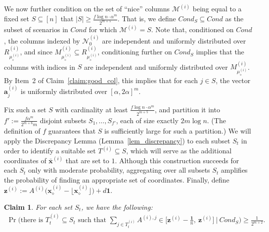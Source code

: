 \documentclass{article}
\newcommand{\cN}{\mathcal{N}}
\newcommand{\dv}[0]{\mathbf{d}}
\newcommand{\av}[0]{\mathbf{a}}
\newcommand{\xv}[0]{\mathbf{x}}
\newcommand{\zv}[0]{\mathbf{z}}
\newcommand{\ones}{{\bm{1}}}
\newcommand{\cM}{\mathcal{M}}
\newcommand{\colij}{\av^{(i)}_j}
\newtheorem{claim}[thm]{Claim}
\newcommand{\nrc}{R}
\begin{document}
We now further condition on the set of ``nice'' columns
$\cM^{(i)}$ being equal to a fixed set $S \subseteq [n]$ that $|S| \geq \frac{f \log n \cdot \alpha^m}{2^{m+{5}}} $.
That is, we define $Cond_S \subseteq Cond$ as the subset of scenarios in $Cond$
for which $\cM^{(i)} = S$.
Note that, conditioned on $Cond$, the columns indexed by $\cN^{(i)}_0$ are
independent and uniformly distributed over
$\nrc^{(i)}_{\mu^{(i)}_\diamond}$, and since
$M^{(i)}_{\mu^{(i)}_{\diamond}} \subseteq \nrc^{(i)}_{\mu^{(i)}_\diamond}$,
conditioning further on $Cond_S$ implies that the columns with indices in $S$
are independent and uniformly distributed over
$M^{(i)}_{\mu^{(i)}_{\diamond}}$.
By Item~2 of Claim~\ref{claim:good_col}, this implies that for each $j \in S$,
the vector $\colij$ is uniformly distributed over $[\alpha, 2\alpha]^m$.

Fix such a set $S$ with cardinality at least
$\frac{f \log n \cdot \alpha^m}{2^{m+5}}$, and partition it into
$f' := \frac{f \alpha^m}{2^{m+6} m}$
disjoint subsets $S_1,\ldots,S_{f'}$, each of size exactly $2m \log n$.
(The definition of $f$ guarantees that $S$ is sufficiently large for such a
partition.) 
We will apply the Discrepancy Lemma (Lemma~\ref{lem_discrepancy}) to each subset
$S_t$ in order to identify a suitable set
$T^{(i)} \subseteq S$, which will serve as the additional coordinates of
$\bar{\xv}^{(i)}$ that are set to $1$.
Although this construction succeeds for each $S_t$ only with moderate
probability, aggregating over all subsets $S_t$ amplifies the probability of
finding an appropriate set of coordinates.
Finally, define
$
\zv^{(i)} :=
A^{(i)} \big(\xv^{(i)}_{\diamond}
- \lfloor \xv^{(i)}_{\diamond} \rfloor \big) + d \ones.$


\begin{claim} \label{claim:useDiscrepancy}
    For each set $S_t$, we have the following:
    \begin{align*}
        \Pr\bigg( \textrm{there is } T^{(i)}_t \subseteq S_t \textrm{ such that } \sum_{j \in T^{(i)}_t} A^{(i),j} \in \bigg[\zv^{(i)} - \frac{\ones}{n},~\zv^{(i)} \bigg] ~\bigg|~ Cond_S\bigg) \ge  \frac{1}{2^{m+2}}.
    \end{align*}
\end{claim}
\end{document}

